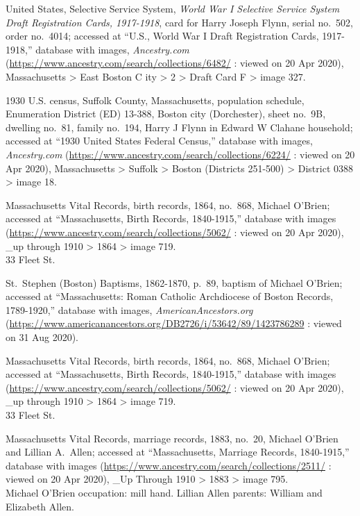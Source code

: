 \begin{thebibliography}{999}
United States, Selective Service System, \textit{World War I Selective Service System Draft Registration Cards, 1917-1918}, card for Harry Joseph Flynn, serial no.\ 502, order no.\ 4014; accessed at ``U.S., World War I Draft Registration Cards, 1917-1918,'' database with images, \textit{Ancestry.com} (\url{https://www.ancestry.com/search/collections/6482/} : viewed on 20 Apr 2020), Massachusetts > East Boston C ity > 2 > Draft Card F > image 327.

1930 U.S. census, Suffolk County, Massachusetts, population schedule, Enumeration District (ED) 13-388, Boston city (Dorchester), sheet no.\ 9B, dwelling no.\ 81, family no.\ 194, Harry J Flynn in Edward W Clahane household; accessed at ``1930 United States Federal Census,'' database with images, \textit{Ancestry.com} (\url{https://www.ancestry.com/search/collections/6224/} : viewed on 20 Apr 2020), Massachusetts > Suffolk > Boston (Districts 251-500) > District 0388 > image 18.


Massachusetts Vital Records, birth records, 1864, no.\ 868, Michael O'Brien; accessed at ``Massachusetts, Birth Records, 1840-1915,'' database with images (\url{https://www.ancestry.com/search/collections/5062/} : viewed on 20 Apr 2020), \_up through 1910 > 1864 > image 719.\\
33 Fleet St.

St.\ Stephen (Boston) Baptisms, 1862-1870, p.\ 89, baptism of Michael O'Brien; accessed at ``Massachusetts: Roman Catholic Archdiocese of Boston Records, 1789-1920,'' database with images, \textit{AmericanAncestors.org} (\url{https://www.americanancestors.org/DB2726/i/53642/89/1423786289} : viewed on 31 Aug 2020).

Massachusetts Vital Records, birth records, 1864, no.\ 868, Michael O'Brien; accessed at ``Massachusetts, Birth Records, 1840-1915,'' database with images (\url{https://www.ancestry.com/search/collections/5062/} : viewed on 20 Apr 2020), \_up through 1910 > 1864 > image 719.\\
33 Fleet St.

Massachusetts Vital Records, marriage records, 1883, no.\ 20, Michael O'Brien and Lillian A.\ Allen; accessed at ``Massachusetts, Marriage Records, 1840-1915,'' database with images (\url{https://www.ancestry.com/search/collections/2511/} : viewed on 20 Apr 2020), \_Up Through 1910 > 1883 > image 795.\\
Michael O'Brien occupation: mill hand. Lillian Allen parents: William and Elizabeth Allen.


\end{thebibliography}
